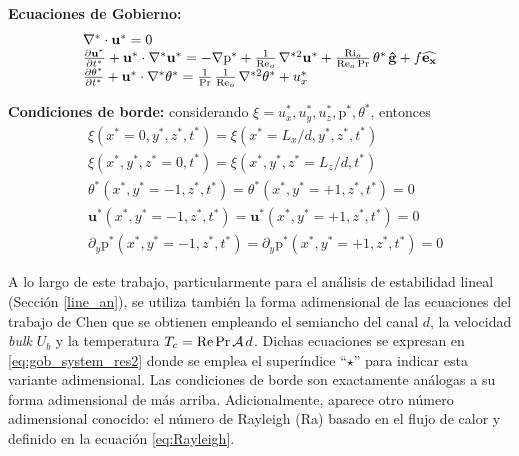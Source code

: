 \textbf{Ecuaciones de Gobierno:}
\begin{equation}
\begin{array}{l}
    \nabla^* \cdot \mathbf{u^*} = 0 \\
    \frac{\partial \mathbf{u^*}}{\partial t^*} + \mathbf{u^*} \cdot \nabla^* \mathbf{u^*} = 
    -\nabla \text{p}^* + \frac{1}{\text{Re}_o} \hspace{0.5mm} \nabla^{*2} \mathbf{u^*} + \frac{\text{Ri}_o}{\text{Re}_o \hspace{0.5mm} \text{Pr}} \hspace{0.5mm} \theta^* \hspace{0.5mm} \mathbf{\hat{g}} + f \mathbf{\widehat{e_x}}  \\
    \frac{\partial \theta^*}{\partial t^*} + \mathbf{u^*} \cdot \nabla^* \theta^* = 
    \frac{1}{\text{Pr}}\hspace{0.5mm}  \frac{1}{\text{Re}_o} \hspace{0.5mm} \nabla^{*2} \theta^* + u_x^* 
\end{array}
\label{eq:gob_system_res1}
\end{equation}

\textbf{Condiciones de borde:} considerando $\xi= u^*_x, u^*_y, u^*_z, \text{p}^*, \theta^*$, entonces
\begin{align}
&\xi(x^*=0,y^*,z^*,t^*) = \xi(x^*=L_x/d,y^*,z^*,t^*) 
	\label{eq:bc_1} \\
&\xi(x^*,y^*,z^*=0,t^*) = \xi(x^*,y^*,z^*=L_z/d,t^*) 
	\label{eq:bc_2} \\
&\theta^*(x^*,y^*=-1,z^*,t^*)       = \theta^*(x^*,y^*=+1,z^*,t^*) = 0
	\label{eq:bc_3} \\
&\mathbf{u^*}(x^*,y^*=-1,z^*,t^*)   = \mathbf{u^*}(x^*,y^*=+1,z^*,t^*) = 0
	\label{eq:bc_4} \\
&\partial_y \text{p}^*(x^*,y^*=-1,z^*,t^*) = \partial_y \text{p}^*(x^*,y^*=+1,z^*,t^*) = 0
	\label{eq:bc_5}
\end{align}


A lo largo de este trabajo, particularmente para el análisis de estabilidad lineal (Sección \ref{line_an}), se utiliza también la forma adimensional de las ecuaciones del trabajo de Chen \cite{chen1996linear} que se obtienen empleando el  semiancho del canal $d$, la velocidad \textit{bulk} $U_b$ y la temperatura $T_c = \text{Re} \hspace{0.5mm} \text{Pr} \hspace{0.5mm} \mathcal{A} \hspace{0.5mm} d$. Dichas ecuaciones se expresan en \ref{eq:gob_system_res2} donde se emplea el superíndice ``${\star}$'' para indicar esta variante adimensional. Las condiciones de borde son exactamente análogas a su forma adimensional de más arriba. Adicionalmente, aparece otro número adimensional conocido: el número de Rayleigh (Ra) basado en el flujo de calor y definido en la ecuación \ref{eq:Rayleigh}.

